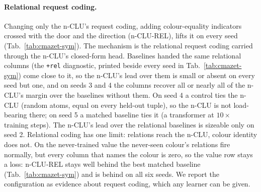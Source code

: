 \documentclass{article} %
\begin{document}
\paragraph{Relational request coding.} Changing only the
n-CLU's request coding, adding colour-equality indicators crossed with the door and the direction
(n-CLU-REL), lifts it on every seed (Tab.~\ref{tab:cmazet-sym}). The mechanism is the
relational request coding carried through the n-CLU's closed-form head. Baselines handed
the same relational columns (the \texttt{+rel} diagnostic, printed beside every seed in
Tab.~\ref{tab:cmazet-sym}) come close to it, so the n-CLU's lead
over them is small or absent on every seed but one, and on seeds 3 and 4 the
columns recover all or nearly all of the n-CLU's margin over the baselines without them. On seed 4 a control
ties the n-CLU (random atoms, equal on every held-out tuple), so the n-CLU is not load-bearing
there; on seed 5 a matched baseline ties it (a transformer at $10\times$ training steps). The n-CLU's lead over the
relational baselines is sizeable only on seed 2. Relational coding has one limit: relations
reach the n-CLU, colour identity does not. On the never-trained value the never-seen colour's
relations fire normally, but every column that names the colour is zero, so the value row stays a
loss: n-CLU-REL stays well behind the best matched baseline (Tab.~\ref{tab:cmazet-sym}) and is %
behind on all six seeds. We report the configuration as evidence about
request coding, which any learner can be given.

\end{document}
